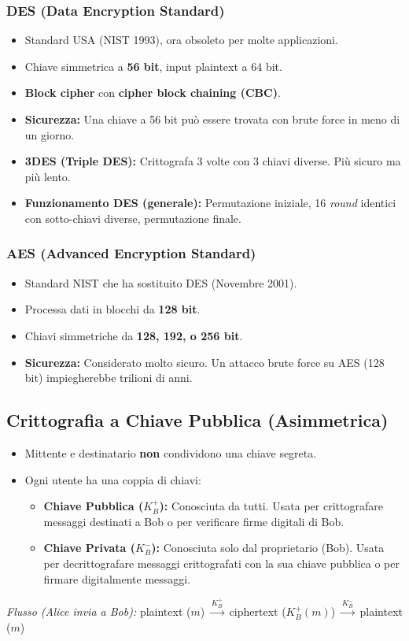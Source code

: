 \subsubsection{DES (Data Encryption Standard)}
\begin{itemize}
    \item Standard USA (NIST 1993), ora obsoleto per molte applicazioni.
    \item Chiave simmetrica a \textbf{56 bit}, input plaintext a 64 bit.
    \item \textbf{Block cipher} con \textbf{cipher block chaining (CBC)}.
    \item \textbf{Sicurezza:} Una chiave a 56 bit può essere trovata con brute force in meno di un giorno.
    \item \textbf{3DES (Triple DES):} Crittografa 3 volte con 3 chiavi diverse. Più sicuro ma più lento.
    \item \textbf{Funzionamento DES (generale):} Permutazione iniziale, 16 \textit{round} identici con sotto-chiavi diverse, permutazione finale.
\end{itemize}

\subsubsection{AES (Advanced Encryption Standard)}
\begin{itemize}
    \item Standard NIST che ha sostituito DES (Novembre 2001).
    \item Processa dati in blocchi da \textbf{128 bit}.
    \item Chiavi simmetriche da \textbf{128, 192, o 256 bit}.
    \item \textbf{Sicurezza:} Considerato molto sicuro. Un attacco brute force su AES (128 bit) impiegherebbe trilioni di anni.
\end{itemize}

\subsection{Crittografia a Chiave Pubblica (Asimmetrica)}
\begin{itemize}
    \item Mittente e destinatario \textbf{non} condividono una chiave segreta.
    \item Ogni utente ha una coppia di chiavi:
    \begin{itemize}
        \item \textbf{Chiave Pubblica ($K_B^+$):} Conosciuta da tutti. Usata per crittografare messaggi destinati a Bob o per verificare firme digitali di Bob.
        \item \textbf{Chiave Privata ($K_B^-$):} Conosciuta solo dal proprietario (Bob). Usata per decrittografare messaggi crittografati con la sua chiave pubblica o per firmare digitalmente messaggi.
    \end{itemize}
\end{itemize}
\textit{Flusso (Alice invia a Bob):} plaintext ($m$) $\xrightarrow{K_B^+}$ ciphertext ($K_B^+(m)$) $\xrightarrow{K_B^-}$ plaintext ($m$)

